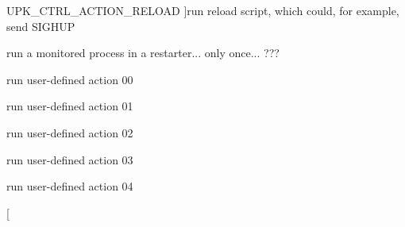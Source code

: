 \begin{Desc}
\begin{description}
{UPK\_\-CTRL\_\-ACTION\_\-RELOAD\label{tp_8c_ga0d570130f3428734fef617272f44b7c9a383e3644953490dd862c59e008f4fbb1}
}]run reload script, which could, for example, send SIGHUP \item[{\em 
UPK\_\-CTRL\_\-ACTION\_\-RUNONCE\label{tp_8c_ga0d570130f3428734fef617272f44b7c9acaa9604bc8089b99580466955f2de9ca}
}]run a monitored process in a restarter... only once... ??? \item[{\em 
UPK\_\-CTRL\_\-CUSTOM\_\-ACTION\_\-00\label{tp_8c_ga0d570130f3428734fef617272f44b7c9ad4d2d51e88be2a15e52904a3156add31}
}]run user-\/defined action 00 \item[{\em 
UPK\_\-CTRL\_\-CUSTOM\_\-ACTION\_\-01\label{tp_8c_ga0d570130f3428734fef617272f44b7c9ac755fb8c7ea7a3fa3a42559451ceb92f}
}]run user-\/defined action 01 \item[{\em 
UPK\_\-CTRL\_\-CUSTOM\_\-ACTION\_\-02\label{tp_8c_ga0d570130f3428734fef617272f44b7c9ade6a2b269652eda6621f40c9319307cd}
}]run user-\/defined action 02 \item[{\em 
UPK\_\-CTRL\_\-CUSTOM\_\-ACTION\_\-03\label{tp_8c_ga0d570130f3428734fef617272f44b7c9aff1cd1fc7ac92bb8e6d9a50944f3fd46}
}]run user-\/defined action 03 \item[{\em 
UPK\_\-CTRL\_\-CUSTOM\_\-ACTION\_\-04\label{tp_8c_ga0d570130f3428734fef617272f44b7c9a09cee2c218fdaf5eec500b9fea35f7c9}
}]run user-\/defined action 04 \item[{\em 
}
\end{description}
\end{Desc}
